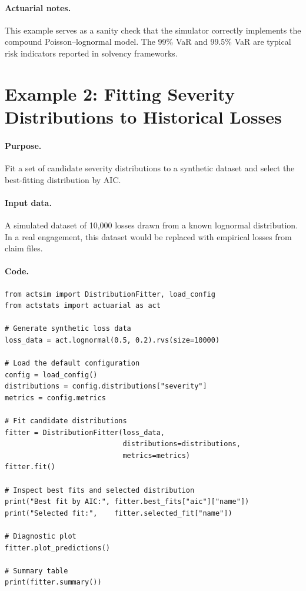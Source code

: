 \paragraph{Actuarial notes.} This example serves as a sanity check
that the simulator correctly implements the compound Poisson--lognormal
model. The 99\% VaR and 99.5\% VaR are typical risk indicators reported
in solvency frameworks.

\section{Example 2: Fitting Severity Distributions to Historical Losses}

\paragraph{Purpose.} Fit a set of candidate severity distributions to a
synthetic dataset and select the best-fitting distribution by AIC.

\paragraph{Input data.} A simulated dataset of 10{,}000 losses drawn
from a known lognormal distribution. In a real engagement, this dataset
would be replaced with empirical losses from claim files.

\paragraph{Code.}
\begin{lstlisting}[style=pythonstyle]
from actsim import DistributionFitter, load_config
from actstats import actuarial as act

# Generate synthetic loss data
loss_data = act.lognormal(0.5, 0.2).rvs(size=10000)

# Load the default configuration
config = load_config()
distributions = config.distributions["severity"]
metrics = config.metrics

# Fit candidate distributions
fitter = DistributionFitter(loss_data,
                            distributions=distributions,
                            metrics=metrics)
fitter.fit()

# Inspect best fits and selected distribution
print("Best fit by AIC:", fitter.best_fits["aic"]["name"])
print("Selected fit:",    fitter.selected_fit["name"])

# Diagnostic plot
fitter.plot_predictions()

# Summary table
print(fitter.summary())
\end{lstlisting}

